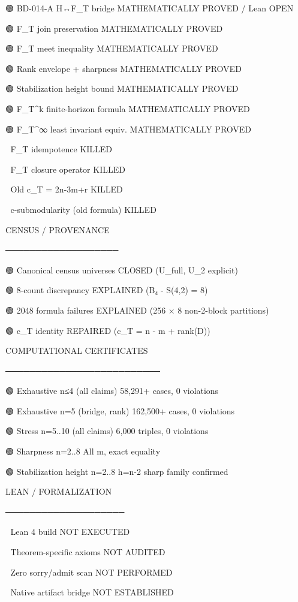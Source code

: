 🟢 BD-014-A H↔F_T bridge        MATHEMATICALLY PROVED / Lean OPEN

🟢 F_T join preservation         MATHEMATICALLY PROVED

🟢 F_T meet inequality           MATHEMATICALLY PROVED

🟢 Rank envelope + sharpness     MATHEMATICALLY PROVED

🟢 Stabilization height bound    MATHEMATICALLY PROVED

🟢 F_T^k finite-horizon formula  MATHEMATICALLY PROVED

🟢 F_T^∞ least invariant equiv.  MATHEMATICALLY PROVED

🔴 F_T idempotence               KILLED

🔴 F_T closure operator          KILLED

🔴 Old c_T = 2n-3m+r            KILLED

🔴 c-submodularity (old formula) KILLED


CENSUS / PROVENANCE

───────────────────

🟢 Canonical census universes    CLOSED (U_full, U_2 explicit)

🟢 8-count discrepancy           EXPLAINED (B₄ - S(4,2) = 8)

🟢 2048 formula failures         EXPLAINED (256 × 8 non-2-block partitions)

🟢 c_T identity                  REPAIRED (c_T = n - m + rank(D))


COMPUTATIONAL CERTIFICATES

──────────────────────────

🟢 Exhaustive n≤4 (all claims)   58,291+ cases, 0 violations

🟢 Exhaustive n=5 (bridge, rank) 162,500+ cases, 0 violations

🟢 Stress n=5..10 (all claims)   6,000 triples, 0 violations

🟢 Sharpness n=2..8              All m, exact equality

🟢 Stabilization height n=2..8   h=n-2 sharp family confirmed


LEAN / FORMALIZATION

────────────────────

🔴 Lean 4 build                   NOT EXECUTED

🔴 Theorem-specific axioms        NOT AUDITED

🔴 Zero sorry/admit scan          NOT PERFORMED

🔴 Native artifact bridge         NOT ESTABLISHED


